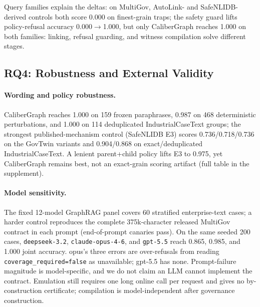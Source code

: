 \documentclass[letterpaper]{article}
\begin{document}
Query families explain the deltas: on MultiGov, AutoLink- and SafeNLIDB-derived controls both score 0.000 on finest-grain traps; the safety guard lifts policy-refusal accuracy 0.000$\to$1.000, but only CaliberGraph reaches 1.000 on both families: linking, refusal guarding, and witness compilation solve different stages.

\subsection{RQ4: Robustness and External Validity}

\paragraph{Wording and policy robustness.}
CaliberGraph reaches 1.000 on 159 frozen paraphrases, 0.987 on 468 deterministic perturbations, and 1.000 on 114 deduplicated IndustrialCaseText groups; the strongest published-mechanism control (SafeNLIDB E3) scores 0.736/0.718/0.736 on the GovTwin variants and 0.904/0.868 on exact/deduplicated IndustrialCaseText. A lenient parent+child policy lifts E3 to 0.975, yet CaliberGraph remains best, not an exact-grain scoring artifact (full table in the supplement).

\paragraph{Model sensitivity.}
The fixed 12-model GraphRAG panel covers 60 stratified enterprise-text cases; a harder control reproduces the complete 375k-character released MultiGov contract in each prompt (end-of-prompt canaries pass). On the same seeded 200 cases, \texttt{deepseek-3.2}, \texttt{claude-opus-4-6}, and \texttt{gpt-5.5} reach 0.865, 0.985, and 1.000 joint accuracy. opus's three errors are over-refusals from reading \texttt{coverage\_required=false} as unavailable; gpt-5.5 has none. Prompt-failure magnitude is model-specific, and we do not claim an LLM cannot implement the contract. Emulation still requires one long online call per request and gives no by-construction certificate; compilation is model-independent after governance construction.
\end{document}
